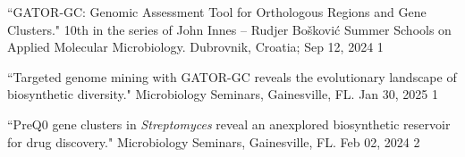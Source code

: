 

 \vspace{-2mm}

\begin{cvpubs}


\cvpub
{``GATOR‐GC: Genomic Assessment Tool for Orthologous Regions and Gene Clusters." 10th in the series of John Innes – Rudjer Bošković Summer Schools on Applied Molecular Microbiology. Dubrovnik, Croatia; Sep 12, 2024}
{1}

\end{cvpubs}


 \vspace{-2mm}

\begin{cvpubs} 


\cvpub
{``Targeted genome mining with GATOR-GC reveals the evolutionary landscape of biosynthetic diversity." Microbiology Seminars, Gainesville, FL. Jan 30, 2025}
{1}

\cvpub
{``PreQ0 gene clusters in \textit{Streptomyces} reveal an anexplored biosynthetic reservoir for drug discovery." Microbiology Seminars, Gainesville, FL. Feb 02, 2024}
{2}

\end{cvpubs}


{} \vspace{-2mm}

